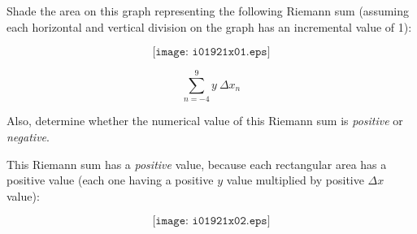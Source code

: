 

Shade the area on this graph representing the following Riemann sum (assuming each horizontal and vertical division on the graph has an incremental value of 1):

$$\texttt{[image: i01921x01.eps]}$$

$$\sum_{n=-4}^{9} y \> \Delta x_n$$

Also, determine whether the numerical value of this Riemann sum is {\it positive} or {\it negative}.







This Riemann sum has a {\it positive} value, because each rectangular area has a positive value (each one having a positive $y$ value multiplied by positive $\Delta x$ value):

$$\texttt{[image: i01921x02.eps]}$$











